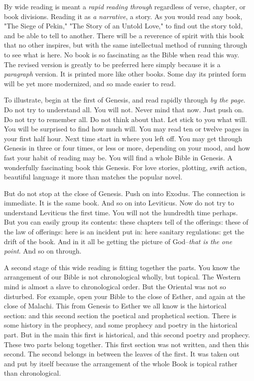 By wide reading is meant a \textit{rapid reading through} regardless of verse,
chapter, or book divisions. Reading it as \textit{a narrative}, a story. As you
would read any book, "The Siege of Pekin," "The Story of an Untold Love,"
to find out the story told, and be able to tell to another. There will be
a reverence of spirit with this book that no other inspires, but with the
same intellectual method of running through to see what is here. No book
is so fascinating as the Bible when read this way. The revised version is
greatly to be preferred here simply because it is a \textit{paragraph} version.
It is printed more like other books. Some day its printed form will be yet
more modernized, and so made easier to read.

To illustrate, begin at the first of Genesis, and read rapidly through \textit{by
the page}. Do not try to understand all. You will not. Never mind that
now. Just push on. Do not try to remember all. Do not think about that.
Let stick to you what will. You will be surprised to find how much will.
You may read ten or twelve pages in your first half hour. Next time start
in where you left off. You may get through Genesis in three or four times,
or less or more, depending on your mood, and how fast your habit of
reading may be. You will find a whole Bible in Genesis. A wonderfully
fascinating book this Genesis. For love stories, plotting, swift action,
beautiful language it more than matches the popular novel.

But do not stop at the close of Genesis. Push on into Exodus. The
connection is immediate. It is the same book. And so on into Leviticus.
Now do not try to understand Leviticus the first time. You will not the
hundredth time perhaps. But you can easily group its contents: these
chapters tell of the offerings: these of the law of offerings: here is an
incident put in: here sanitary regulations: get the drift of the book. And
in it all be getting the picture of God--\textit{that is the one point}. And so
on through.

A second stage of this wide reading is fitting together the parts. You
know the arrangement of our Bible is not chronological wholly, but
topical. The Western mind is almost a slave to chronological order. But
the Oriental was not so disturbed. For example, open your Bible to the
close of Esther, and again at the close of Malachi. This from Genesis to
Esther we all know is the historical section: and this second section the
poetical and prophetical section. There is some history in the prophecy,
and some prophecy and poetry in the historical part. But in the main this
first is historical, and this second poetry and prophecy. These two parts
belong together. This first section was not written, and then this second.
The second belongs in between the leaves of the first. It was taken out
and put by itself because the arrangement of the whole Book is topical
rather than chronological.

